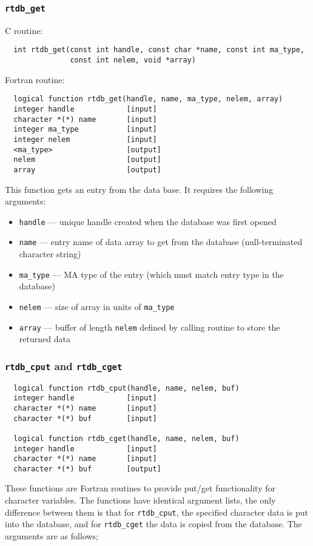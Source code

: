 \subsubsection{{\tt rtdb\_get}}

C routine:

\begin{verbatim}
  int rtdb_get(const int handle, const char *name, const int ma_type,
               const int nelem, void *array)
\end{verbatim}


Fortran routine:

\begin{verbatim}
  logical function rtdb_get(handle, name, ma_type, nelem, array)
  integer handle            [input]
  character *(*) name       [input]
  integer ma_type           [input]
  integer nelem             [input]
  <ma_type>                 [output]
  nelem                     [output]
  array                     [output]
\end{verbatim}
This function gets an entry from the data base. It requires the following arguments:
\begin{itemize}
\item {\tt handle} --- unique handle created when the database was first opened
\item {\tt name} --- entry name of data array to get from the database (null-terminated character string)
\item {\tt ma\_type} --- MA type of the entry (which must match entry type in the database)
\item {\tt nelem} --- size of array in units of {\tt ma\_type}
\item {\tt array} --- buffer of length {\tt nelem} defined by calling routine to store the returned data
\end{itemize}

\subsubsection{{\tt rtdb\_cput} and {\tt rtdb\_cget}}

\begin{verbatim}
  logical function rtdb_cput(handle, name, nelem, buf)
  integer handle            [input]
  character *(*) name       [input]
  character *(*) buf        [input]

  logical function rtdb_cget(handle, name, nelem, buf)
  integer handle            [input]
  character *(*) name       [input]
  character *(*) buf        [output]
\end{verbatim}
These functions are Fortran routines to provide put/get functionality for character
variables.  The functions have identical argument lists, the only difference between them is that for
{\tt rtdb\_cput}, the specified character data is put into the database, and for 
{\tt rtdb\_cget} the data is copied from the database.  The arguments are as follows;

